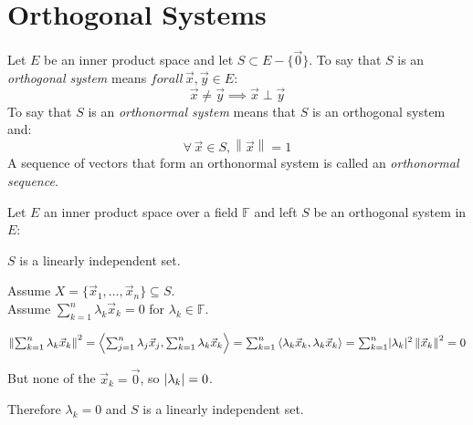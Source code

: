 \documentclass[letterpaper,12pt,fleqn]{article}
\newcommand{\vx}{\vec{x}}
\newcommand{\vy}{\vec{y}}
\newcommand{\vo}{\vec{0}}
\newcommand{\norm}[1]{\left\|#1\right\|}
\newcommand{\inner}[1]{\left<#1\right>}
\newcommand{\F}{\mathbb{F}}
\renewcommand{\l}{\lambda}
\begin{document}
\section*{Orthogonal Systems}

\begin{definition}
  Let $E$ be an inner product space and let $S\subset E-\{\vo\}$. To say that
  $S$ is an \emph{orthogonal system} means $forall\,\vx,\vy\in E$:
  \[\vx\ne\vy\implies\vx\perp\vy\]
  To say that $S$ is an \emph{orthonormal system} means that $S$ is an
  orthogonal system and:
  \[\forall\,\vx\in S,\norm{\vx}=1\]
  A sequence of vectors that form an orthonormal system is called an
  \emph{orthonormal sequence}.
\end{definition}

\begin{theorem}
  Let $E$ an inner product space over a field $\F$ and left $S$ be an
  orthogonal system in $E$:

  \qquad$S$ is a linearly independent set.
\end{theorem}

\begin{theproof}
  Assume $X=\{\vx_1,\ldots,\vx_n\}\subseteq S$. \\
  Assume $\sum_{k=1}^n\l_k\vx_k=0$ for $\l_k\in\F$.
  
  $\norm{\sum_{k=1}^n\l_k\vx_k}^2=
  \inner{\sum_{j=1}^n\l_j\vx_j,\sum_{k=1}^n\l_k\vx_k}=
  \sum_{k=1}^n\inner{\l_k\vx_k,\l_k\vx_k}=
  \sum_{k=1}^n\abs{\l_k}^2\norm{\vx_k}^2=0$
  
  But none of the $\vx_k=\vo$, so $\abs{\l_k}=0$.
  
  Therefore $\l_k=0$ and $S$ is a linearly independent set.
\end{theproof}
\end{document}
